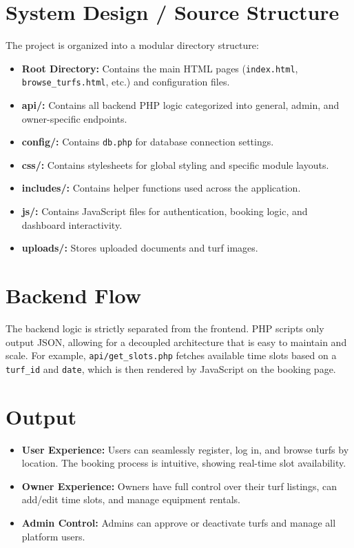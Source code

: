 \documentclass[12pt]{report}
\begin{document}
\section{System Design / Source Structure}
The project is organized into a modular directory structure:
\begin{itemize}
    \item \textbf{Root Directory:} Contains the main HTML pages (\texttt{index.html}, \texttt{browse\_turfs.html}, etc.) and configuration files.
    \item \textbf{api/:} Contains all backend PHP logic categorized into general, admin, and owner-specific endpoints.
    \item \textbf{config/:} Contains \texttt{db.php} for database connection settings.
    \item \textbf{css/:} Contains stylesheets for global styling and specific module layouts.
    \item \textbf{includes/:} Contains helper functions used across the application.
    \item \textbf{js/:} Contains JavaScript files for authentication, booking logic, and dashboard interactivity.
    \item \textbf{uploads/:} Stores uploaded documents and turf images.
\end{itemize}

\section{Backend Flow}
The backend logic is strictly separated from the frontend. PHP scripts only output JSON, allowing for a decoupled architecture that is easy to maintain and scale. For example, \texttt{api/get\_slots.php} fetches available time slots based on a \texttt{turf\_id} and \texttt{date}, which is then rendered by JavaScript on the booking page.

\section{Output}
\begin{itemize}
    \item \textbf{User Experience:} Users can seamlessly register, log in, and browse turfs by location. The booking process is intuitive, showing real-time slot availability.
    \item \textbf{Owner Experience:} Owners have full control over their turf listings, can add/edit time slots, and manage equipment rentals.
    \item \textbf{Admin Control:} Admins can approve or deactivate turfs and manage all platform users.
\end{itemize}
\end{document}

